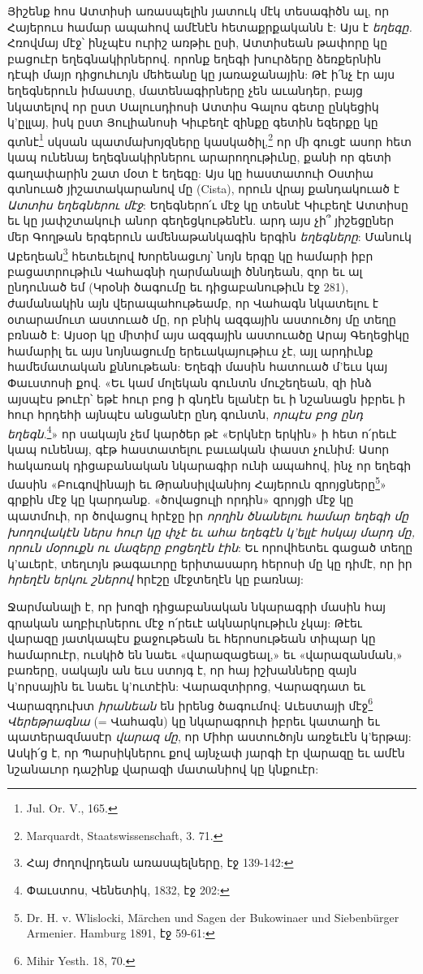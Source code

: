 \documentclass{article}
\begin{document}
{Յիշենք հոս Ատտիսի առասպելին յատուկ մէկ տեսագիծն ալ, որ Հայերուս համար ապահով ամէնէն հետաքրքականն է: Այս է \emph{եղեգը.} Հռովմայ մէջ՝ ինչպէս ուրիշ առթիւ ըսի, Ատտիսեան թափորը կը բացուէր եղեգնակիրներով. որոնք եղեգի խուրձերը ձեռքերնին դէպի մայր դիցուհւոյն մեհեանը կը յառաջանային: Թէ ի՛նչ էր այս եղեգներուն իմաստը, մատենագիրները չեն աւանդեր, բայց նկատելով որ ըստ Սալուսդիոսի Ատտիս Գալոս գետը ընկեցիկ կ'ըլլայ, իսկ ըստ Յուլիանոսի Կիւբեղէ զինքը գետին եզերքը կը գտնէ\footnote{Jul. Or. V., 165.} սկսան պատմախոյզները կասկածիլ,\footnote{Marquardt, Staatswissenschaft, 3. 71.} որ մի գուցէ ասոր հետ կապ ունենայ եղեգնակիրներու արարողութիւնը, քանի որ գետի գաղափարին շատ մօտ է եղեգը: Այս կը հաստատուի Օստիա գտնուած յիշատակարանով մը (Cista), որուն վրայ քանդակուած է \emph{Ատտիս եղեգներու մէջ}: Եղեգներո՛ւ մէջ կը տեսնէ Կիւբեղէ Ատտիսը եւ կը յափշտակուի անոր գեղեցկութենէն. արդ այս չի՞ յիշեցըներ մեր Գողթան երգերուն ամենաթանկագին երգին \emph{եղեգները}: Մանուկ Աբեղեան\footnote{Հայ ժողովրդեան առասպելները, էջ 139-142:} հետեւելով Խորենացւոյ՝ նոյն երգը կը համարի իբր բացատրութիւն Վահագնի ղարմանալի ծննդեան, զոր եւ ալ ընդունած եմ (Կրօնի ծագումը եւ դիցաբանութիւն էջ 281), ժամանակին այն վերապահութեամբ, որ Վահագն նկատելու է օտարամուտ աստուած մը, որ բնիկ ազգային աստուծոյ մը տեղը բռնած է: Այսօր կը միտիմ այս ազգային աստուածը Արայ Գեղեցիկը համարիլ եւ այս նոյնացումը երեւակայութիւս չէ, այլ արդիւնք համեմատական քննութեան: Եղեգի մասին հատուած մ'եւս կայ Փաւստոսի քով. «Եւ կամ մոլեկան գունտն մուշեղեան, զի ինձ այսպէս թուէր՝ եթէ հուր բոց ի գնդէն ելանէր եւ ի նշանացն իբրեւ ի հուր հրդեհի այնպէս անցանէր ընդ գունտն, \emph{որպէս բոց ընդ եղեգն}.\footnote{Փաւստոս, Վենետիկ, 1832, էջ 202:}» որ սակայն չեմ կարծեր թէ «Երկնէր երկին» ի հետ ո՛րեւէ կապ ունենայ, գէթ հաստատելու բաւական փաստ չունիմ: Ասոր հակառակ դիցաբանական նկարագիր ունի ապահով, ինչ որ եղեգի մասին «Բուգովինայի եւ Թրանսիլվանիոյ Հայերուն զրոյցները\footnote{Dr. H. v. Wlislocki, Märchen und Sagen der Bukowinaer und Siebenbürger Armenier. Hamburg 1891, էջ 59-61:}» գրքին մէջ կը կարդանք. «ծովացուլի որդին» զրոյցի մէջ կը պատմուի, որ ծովացուլ հրէջը իր \emph{որղին ծնանելու համար եղեգի մը խողովակէն ներս հուր կը փչէ եւ ահա եղեգէն կ'ելլէ հսկայ մարդ մը, որուն մօրուքն ու մազերը բոցեղէն էին}: Եւ որովհետեւ գացած տեղը կ'աւերէ, տեղւոյն թագաւորը երիտասարդ հերոսի մը կը դիմէ, որ իր \emph{հրեղէն երկու շներով} հրէշը մէջտեղէն կը բառնայ:

Ջարմանալի է, որ խոզի դիցաբանական նկարագրի մասին հայ գրական աղբիւրներու մէջ ո՛րեւէ ակնարկութիւն չկայ: Թէեւ վարազը յատկապէս քաջութեան եւ հերոսութեան տիպար կը համարուէր, ուսկիծ են նաեւ «վարազացեալ,» եւ «վարազանման,» բառերը, սակայն ան եւս ստոյգ է, որ հայ իշխանները զայն կ'որսային եւ նաեւ կ'ուտէին: Վարազտիրոց, Վարազդատ եւ Վարազդուխտ \emph{իրանեան} են իրենց ծագումով: Աւեստայի մէջ\footnote{Mihir Yesth. 18, 70.} \emph{Վերեթրագնա} (= Վահագն) կը նկարագրուի իբրեւ կատաղի եւ պատերազմասէր \emph{վարազ մը}, որ Միհր աստուծոյն առջեւէն կ'երթայ: Ասկի՛ց է, որ Պարսիկներու քով այնչափ յարգի էր վարազը եւ ամէն նշանաւոր դաշինք վարազի մատանիով կը կնքուէր:

}
\end{document}
